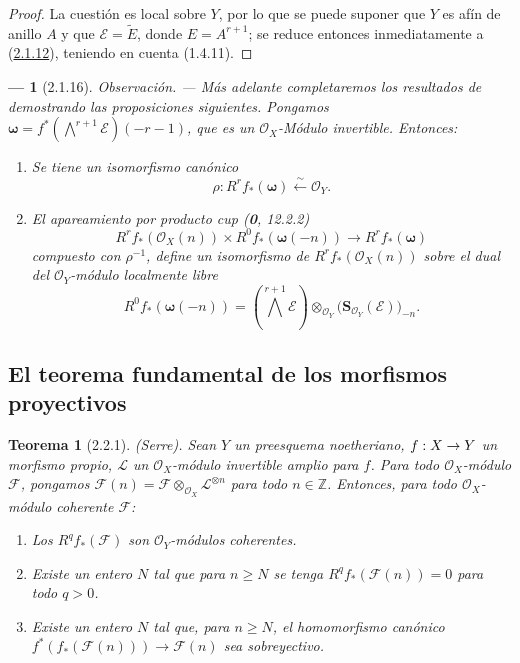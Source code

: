 \documentclass[10pt,oneside,openany]{book}
\theoremstyle{egaenv}\newtheorem*{env}{---}
\theoremstyle{egastatement}
\newtheorem*{theorem}{Teorema}
\theoremstyle{egadescription}
\newcommand{\oldpage}[2][]{\marginnote{\normalfont\scriptsize\textbf{#1}\,|\,#2}\ignorespaces}
\renewcommand{\geq}{\geqslant}
\renewcommand{\to}{\mathchoice{\longrightarrow}{\rightarrow}{\rightarrow}{\rightarrow}}
\begin{document}
\begin{proof}
La cuestión es local sobre $Y$, por lo que se puede suponer que $Y$ es afín de anillo $A$ y que $\mathcal E=\widetilde E$, donde $E=A^{r+1}$; se reduce entonces inmediatamente a (\hyperref[III.2.1.12-fr]{2.1.12}), teniendo en cuenta (1.4.11).
\end{proof}

\begin{env}[2.1.16]
\label{III.2.1.16}
\label{III.2.1.16-fr}
\emph{Observación.} ---
Más adelante completaremos los resultados de  demostrando las proposiciones siguientes.
Pongamos
$\boldsymbol\omega=f^*(\bigwedge^{r+1}\mathcal E)(-r-1)$,
que es un $\mathcal O_X$-Módulo invertible. Entonces:
\begin{enumerate}
\item[{\rm(i)}] Se tiene un isomorfismo canónico
\begin{equation}
\label{III.2.1.16.1-fr}
\tag{2.1.16.1}
\rho:R^rf_*(\boldsymbol\omega)\xleftarrow{\sim}\mathcal O_Y.
\end{equation}
\item[{\rm(ii)}] El apareamiento por producto cup (\textbf{0}, 12.2.2)
\begin{equation}
\label{III.2.1.16.2-fr}
\tag{2.1.16.2}
R^rf_*(\mathcal O_X(n))\times R^0f_*(\boldsymbol\omega(-n))
\longrightarrow R^rf_*(\boldsymbol\omega)
\end{equation}
  compuesto con $\rho^{-1}$, define un \emph{isomorfismo} de $R^rf_*(\mathcal O_X(n))$ sobre el \emph{dual} del $\mathcal O_Y$-módulo localmente libre
  \[
R^0f_*(\boldsymbol\omega(-n))
=\left(\bigwedge^{r+1}\mathcal E\right)
\otimes_{\mathcal O_Y}\bigl(\mathbf S_{\mathcal O_Y}(\mathcal E)\bigr)_{-n}.
\]
\end{enumerate}
\end{env}

\subsection{El teorema fundamental de los morfismos proyectivos}
\label{subsection:III.2.2}
\label{subsection:III.2.2-fr}
\oldpage[III]{100}

\begin{theorem}[2.2.1]
\label{III.2.2.1-fr}
(Serre). Sean $Y$ un preesquema noetheriano, $f:X\to Y$ un morfismo propio, $\mathcal L$ un $\mathcal O_X$-módulo invertible amplio para $f$. Para todo $\mathcal O_X$-módulo $\mathcal F$, pongamos
$\mathcal F(n)=\mathcal F\otimes_{\mathcal O_X}\mathcal L^{\otimes n}$
para todo $n\in\mathbb Z$. Entonces, para todo $\mathcal O_X$-módulo coherente $\mathcal F$:
\begin{enumerate}
\item[{\rm(i)}] Los $R^qf_*(\mathcal F)$ son $\mathcal O_Y$-módulos coherentes.
\item[{\rm(ii)}] Existe un entero $N$ tal que para $n\geq N$ se tenga $R^qf_*(\mathcal F(n))=0$ para todo $q>0$.
\item[{\rm(iii)}] Existe un entero $N$ tal que, para $n\geq N$, el homomorfismo canónico
$f^*(f_*(\mathcal F(n)))\longrightarrow\mathcal F(n)$
sea sobreyectivo.
\end{enumerate}
\end{theorem}
\end{document}
